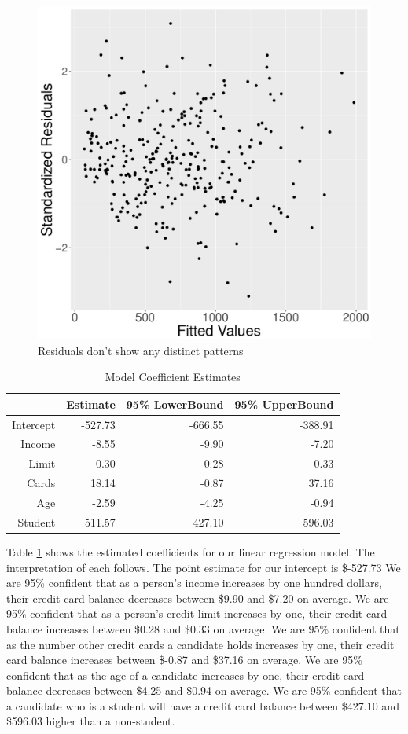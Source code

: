 \documentclass{article}
\begin{document}
\begin{figure}
\centering
\includegraphics[scale=.3]{fitted.pdf}
\caption{Residuals don't show any distinct patterns}
\label{fitted}
\end{figure}


\begin{table}[ht]
\centering
\begin{tabular}{rrrr}
  \hline
 & Estimate & 95\% LowerBound & 95\% UpperBound \\ 
  \hline
Intercept & -527.73 & -666.55 & -388.91 \\ 
  Income & -8.55 & -9.90 & -7.20 \\ 
  Limit & 0.30 & 0.28 & 0.33 \\ 
  Cards & 18.14 & -0.87 & 37.16 \\ 
  Age & -2.59 & -4.25 & -0.94 \\ 
  Student & 511.57 & 427.10 & 596.03 \\ 
   \hline
\end{tabular}
\caption{Model Coefficient Estimates} 
\label{coefs}
\end{table}

Table \ref{coefs} shows the estimated coefficients for our linear regression model. The interpretation of each follows. The point estimate for our intercept is \$-527.73 We are 95\% confident that as a person's income increases by one hundred dollars, their credit card balance decreases between \$9.90 and \$7.20 on average.  We are 95\% confident that as a person's credit limit increases by one, their credit card balance increases between \$0.28 and \$0.33 on average.  We are 95\% confident that as the number other credit cards a candidate holds increases by one, their credit card balance increases between \$-0.87 and \$37.16 on average. We are 95\% confident that as the age of a candidate increases by one, their credit card balance decreases between \$4.25 and \$0.94 on average. We are 95\% confident that a candidate who is a student will have a credit card balance between \$427.10 and \$596.03 higher than a non-student.
\end{document}
